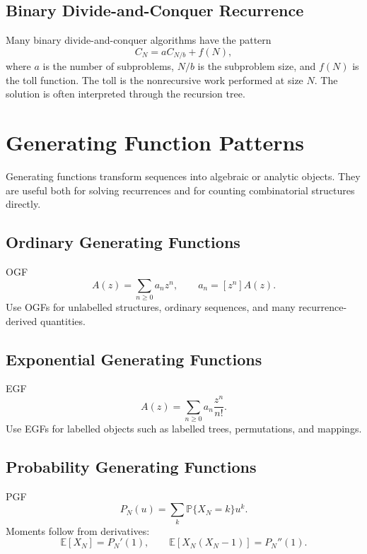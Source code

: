 \documentclass[11pt]{article}
\newcommand{\E}{\mathbb{E}}
\newcommand{\Prob}{\mathbb{P}}
\begin{document}
\subsection{Binary Divide-and-Conquer Recurrence}

Many binary divide-and-conquer algorithms have the pattern
\[
C_N = aC_{N/b}+f(N),
\]
where \(a\) is the number of subproblems, \(N/b\) is the subproblem size, and \(f(N)\) is the toll function. The toll is the nonrecursive work performed at size \(N\). The solution is often interpreted through the recursion tree.

\section{Generating Function Patterns}

Generating functions transform sequences into algebraic or analytic objects. They are useful both for solving recurrences and for counting combinatorial structures directly.

\subsection{Ordinary Generating Functions}

\begin{mathbox}{OGF}
\[
A(z)=\sum_{n\ge0}a_nz^n,
\qquad
 a_n=[z^n]A(z).
\]
Use OGFs for unlabelled structures, ordinary sequences, and many recurrence-derived quantities.
\end{mathbox}

\subsection{Exponential Generating Functions}

\begin{mathbox}{EGF}
\[
A(z)=\sum_{n\ge0}a_n\frac{z^n}{n!}.
\]
Use EGFs for labelled objects such as labelled trees, permutations, and mappings.
\end{mathbox}

\subsection{Probability Generating Functions}

\begin{mathbox}{PGF}
\[
P_N(u)=\sum_k \Prob\{X_N=k\}u^k.
\]
Moments follow from derivatives:
\[
\E[X_N]=P_N'(1),
\qquad
\E[X_N(X_N-1)]=P_N''(1).
\]
\end{mathbox}
\end{document}
